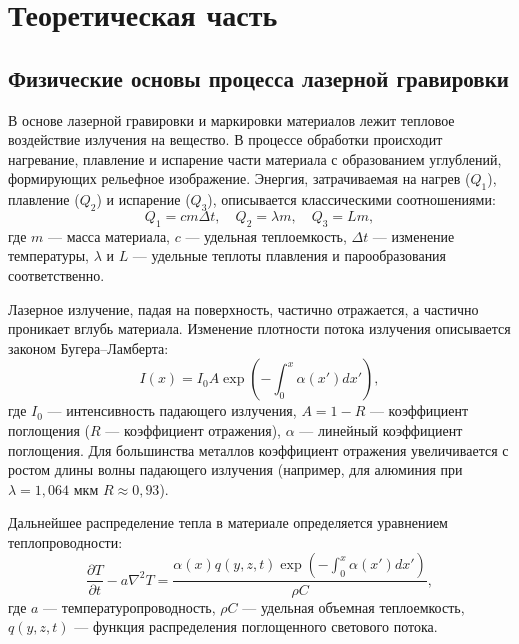 \documentclass[12pt, a4paper]{article}
\begin{document}
\newpage





\section*{Теоретическая часть}

\subsection*{Физические основы процесса лазерной гравировки}
В основе лазерной гравировки и маркировки материалов лежит тепловое воздействие излучения на вещество. В процессе обработки происходит нагревание, плавление и испарение части материала с образованием углублений, формирующих рельефное изображение. Энергия, затрачиваемая на нагрев ($Q_1$), плавление ($Q_2$) и испарение ($Q_3$), описывается классическими соотношениями:
\begin{equation}
    Q_1 = c m \Delta t, \quad Q_2 = \lambda m, \quad Q_3 = L m,
\end{equation}
где $m$ --- масса материала, $c$ --- удельная теплоемкость, $\Delta t$ --- изменение температуры, $\lambda$ и $L$ --- удельные теплоты плавления и парообразования соответственно.

Лазерное излучение, падая на поверхность, частично отражается, а частично проникает вглубь материала. Изменение плотности потока излучения описывается законом Бугера--Ламберта:
\begin{equation}
    I(x) = I_0 A \exp\left(-\int_0^x \alpha(x') dx'\right),
\end{equation}
где $I_0$ --- интенсивность падающего излучения, $A = 1 - R$ --- коэффициент поглощения ($R$ --- коэффициент отражения), $\alpha$ --- линейный коэффициент поглощения. Для большинства металлов коэффициент отражения увеличивается с ростом длины волны падающего излучения (например, для алюминия при $\lambda = 1{,}064$ мкм $R \approx 0{,}93$).

Дальнейшее распределение тепла в материале определяется уравнением теплопроводности:
\begin{equation}
    \frac{\partial T}{\partial t} - a \nabla^2 T = \frac{\alpha(x) q(y,z,t) \exp\left(-\int_0^x \alpha(x') dx'\right)}{\rho C},
\end{equation}
где $a$ --- температуропроводность, $\rho C$ --- удельная объемная теплоемкость, $q(y,z,t)$ --- функция распределения поглощенного светового потока.
\end{document}
